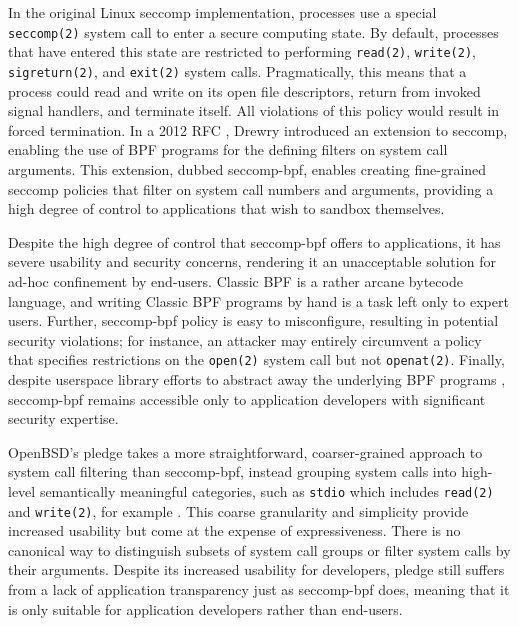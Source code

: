 
In the original Linux seccomp implementation, processes use a special \texttt{seccomp(2)} system call to enter a secure computing state. By default, processes that have entered this state are restricted to performing \texttt{read(2)}, \texttt{write(2)}, \texttt{sigreturn(2)}, and \texttt{exit(2)} system calls.  Pragmatically, this means that a process could read and write on its open file descriptors, return from invoked signal handlers, and terminate itself. All violations of this policy would result in forced termination. In a 2012 RFC \cite{drewry2012_seccomp_bpf}, Drewry introduced an extension to seccomp, enabling the use of BPF programs for the defining filters on system call arguments. This extension, dubbed seccomp-bpf, enables creating fine-grained seccomp policies that filter on system call numbers and arguments, providing a high degree of control to applications that wish to sandbox themselves.

Despite the high degree of control that seccomp-bpf offers to applications, it has severe usability and security concerns, rendering it an unacceptable solution for ad-hoc confinement by end-users. Classic BPF \cite{mccanne1993_bpf} is a rather arcane bytecode language, and writing Classic BPF programs by hand is a task left only to expert users. Further, seccomp-bpf policy is easy to misconfigure, resulting in potential security violations; for instance, an attacker may entirely circumvent a policy that specifies restrictions on the \texttt{open(2)} system call but not \texttt{openat(2)}. Finally, despite userspace library efforts to abstract away the underlying BPF programs \cite{libseccomp}, seccomp-bpf remains accessible only to application developers with significant security expertise.

OpenBSD's pledge \cite{pledge} takes a more straightforward, coarser-grained approach to system call filtering than seccomp-bpf, instead grouping system calls into high-level semantically meaningful categories, such as \texttt{stdio} which includes \texttt{read(2)} and \texttt{write(2)}, for example \cite{anderson2017_comparison}. This coarse granularity and simplicity provide increased usability but come at the expense of expressiveness. There is no canonical way to distinguish subsets of system call groups or filter system calls by their arguments.  Despite its increased usability for developers, pledge still suffers from a lack of application transparency just as seccomp-bpf does, meaning that it is only suitable for application developers rather than end-users.


